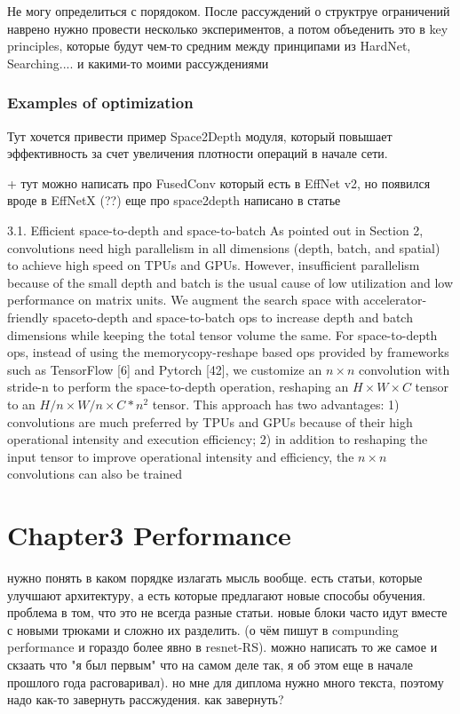 Не могу определиться с порядоком. После рассуждений о структруе ограничений наврено нужно провести несколько экспериментов, а потом объеденить это в key principles, которые будут чем-то средним между принципами из HardNet, Searching.... и какими-то моими рассуждениями



\subsection{Examples of optimization}
Тут хочется привести пример Space2Depth модуля, который повышает эффективность за счет увеличения плотности операций в начале сети. 

 + тут можно написать про FusedConv который есть в EffNet v2, но появился вроде в EffNetX (??) 
еще про space2depth написано в статье \cite{ridnik2021_tresnet}


3.1. Efficient space-to-depth and space-to-batch
As pointed out in Section 2, convolutions need high parallelism in all dimensions (depth, batch, and spatial) to achieve high speed on TPUs and GPUs. However, insufficient parallelism because of the small depth and batch is the usual cause of low utilization and low performance on matrix units. We augment the search space with accelerator-friendly spaceto-depth and space-to-batch ops to increase depth and batch dimensions while keeping the total tensor volume the same. For space-to-depth ops, instead of using the memorycopy-reshape based ops provided by frameworks such as TensorFlow [6] and Pytorch [42], we customize an $n \times n$ convolution with stride-n to perform the space-to-depth operation, reshaping an $H \times W \times C$ tensor to an $H / n \times W / n \times C * n^{2}$ tensor. This approach has two advantages: 1) convolutions are much preferred by TPUs and GPUs because of their high operational intensity and execution efficiency; 2) in addition to reshaping the input tensor to improve operational intensity and efficiency, the $n \times n$ convolutions can also be trained


\chapter{Chapter3 Performance}

нужно понять в каком порядке излагать мысль вообще. есть статьи, которые улучшают архитектуру, а есть которые предлагают новые способы обучения. проблема в том, что это не всегда разные статьи. новые блоки часто идут вместе с новыми трюками и сложно их разделить. (о чём пишут в compunding performance и гораздо более явно в resnet-RS). можно написать то же самое и скзаать что "я был первым" что на самом деле так, я об этом еще в начале прошлого года расговаривал). но мне для диплома нужно много текста, поэтому надо как-то завернуть рассжудения. как завернуть? 

